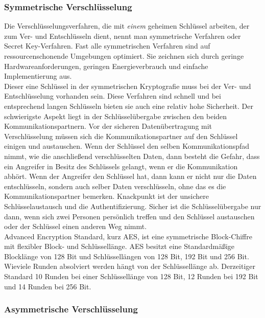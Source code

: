 \documentclass[letterpaper, 12pt]{article}
\let\tempsubsubsection\subsubsection
\renewcommand\subsubsection[1]{\vspace{0cm}\tempsubsubsection{#1}\vspace{0cm}}
\begin{document}
\subsubsection{Symmetrische Verschlüsselung}
Die Verschlüsselungsverfahren, die mit \textit{einem} geheimen Schlüssel arbeiten, der zum Ver- und Entschlüsseln dient, nennt man symmetrische Verfahren oder Secret Key-Verfahren. Fast alle symmetrischen Verfahren sind auf ressourcenschonende Umgebungen optimiert. Sie zeichnen sich durch geringe Hardwareanforderungen, geringen Energieverbrauch und einfache Implementierung aus. \\
Dieser eine Schlüssel in der symmetrischen Kryptografie muss bei der Ver- und Entschlüsselung vorhanden sein. Diese Verfahren sind schnell und bei entsprechend langen Schlüsseln bieten sie auch eine relativ hohe Sicherheit.
Der schwierigste Aspekt liegt in der Schlüsselübergabe zwischen den beiden Kommunikationspartnern. Vor der sicheren Datenübertragung mit Verschlüsselung müssen sich die Kommunikationspartner auf den Schlüssel einigen und austauschen. Wenn der Schlüssel den selben Kommunikationspfad nimmt, wie die anschließend verschlüsselten Daten, dann besteht die Gefahr, dass ein Angreifer in Besitz des Schlüssels gelangt, wenn er die Kommunikation abhört. Wenn der Angreifer den Schlüssel hat, dann kann er nicht nur die Daten entschlüsseln, sondern auch selber Daten verschlüsseln, ohne das es die Kommunikationspartner bemerken. Knackpunkt ist der unsichere Schlüsselaustausch und die Authentifizierung.
Sicher ist die Schlüsselübergabe nur dann, wenn sich zwei Personen persönlich treffen und den Schlüssel austauschen oder der Schlüssel einen anderen Weg nimmt. \\
Advanced Encryption Standard, kurz AES, ist eine symmetrische Block-Chiffre mit flexibler Block- und Schlüssellänge.
AES besitzt eine Standardmäßige Blocklänge von 128 Bit und Schlüssellängen
von 128 Bit, 192 Bit und 256 Bit. Wieviele Runden absolviert werden hängt von der
Schlüssellänge ab. Derzeitiger Standard 10 Runden bei einer Schlüssellänge von 128 Bit,
12 Runden bei 192 Bit und 14 Runden bei 256 Bit. \cite{ausarbeitungsec}

\subsubsection{Asymmetrische Verschlüsselung}
\end{document}
